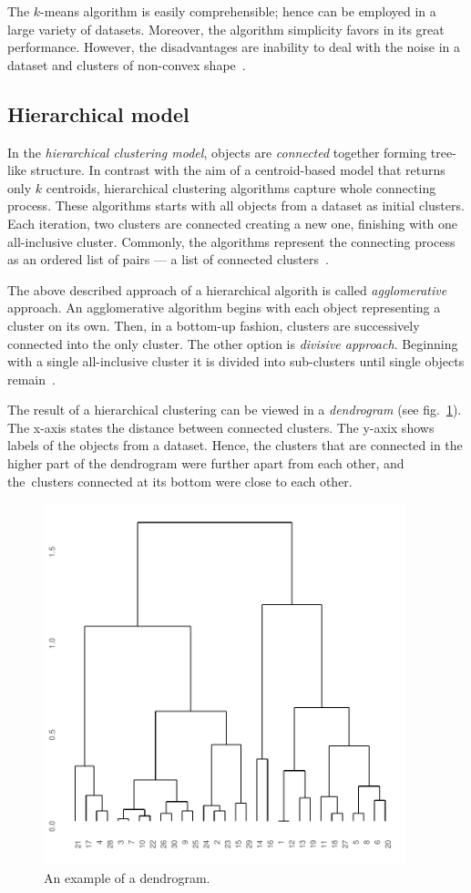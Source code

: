 The $k$-means algorithm is easily comprehensible; hence can be employed in a large variety of datasets. Moreover, the algorithm simplicity favors in its great performance. However, the disadvantages are inability to deal with the noise in a dataset and clusters of non-convex shape~\cite{uppada2014centroid}.
  

\subsection{Hierarchical model}

In the \emph{hierarchical clustering model}, objects are \emph{connected} together forming tree-like structure. In contrast with the aim of a centroid-based model that returns only $k$ centroids, hierarchical clustering algorithms capture whole connecting process. These algorithms starts with all objects from a dataset as initial clusters. Each iteration, two clusters are connected creating a new one, finishing with one all-inclusive cluster. Commonly, the algorithms represent the connecting process as an ordered list of pairs --- a list of connected clusters~\cite{karypis1999chameleon}.

The above described approach of a hierarchical algorith is called \emph{agglomerative} approach. An agglomerative algorithm begins with each object representing a cluster on its own. Then, in a bottom-up fashion, clusters are successively connected into the only cluster. The other option is \emph{divisive approach}. Beginning with a single all-inclusive cluster it is divided into sub-clusters until single objects remain~\cite{rokach2005clustering}. 

The result of a hierarchical clustering can be viewed in a \emph{dendrogram} (see fig.~\ref{fig01:dendro}). The x-axis states the distance between connected clusters. The y-axix shows labels of the objects from a dataset. Hence, the clusters that are connected in the higher part of the dendrogram were further apart from each other, and the~clusters connected at its bottom were close to each other.

\begin{figure}\centering
	\includegraphics[width=10.5cm]{img/dendro}
	\caption{An example of a dendrogram.}
	\label{fig01:dendro}
\end{figure}

